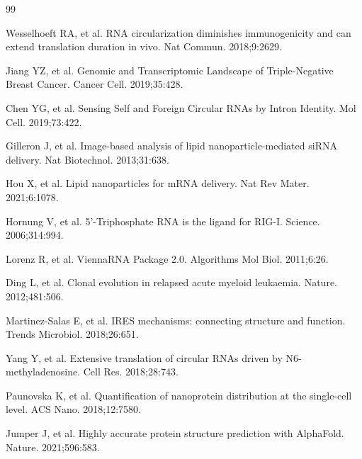 \documentclass[12pt,a4paper]{article}
\begin{document}
\begin{thebibliography}{99}

Wesselhoeft RA, et al. RNA circularization diminishes immunogenicity and can extend translation duration in vivo. Nat Commun. 2018;9:2629.

Jiang YZ, et al. Genomic and Transcriptomic Landscape of Triple-Negative Breast Cancer. Cancer Cell. 2019;35:428.

Chen YG, et al. Sensing Self and Foreign Circular RNAs by Intron Identity. Mol Cell. 2019;73:422.

Gilleron J, et al. Image-based analysis of lipid nanoparticle-mediated siRNA delivery. Nat Biotechnol. 2013;31:638.

Hou X, et al. Lipid nanoparticles for mRNA delivery. Nat Rev Mater. 2021;6:1078.

Hornung V, et al. 5'-Triphosphate RNA is the ligand for RIG-I. Science. 2006;314:994.

Lorenz R, et al. ViennaRNA Package 2.0. Algorithms Mol Biol. 2011;6:26.

Ding L, et al. Clonal evolution in relapsed acute myeloid leukaemia. Nature. 2012;481:506.

Martinez-Salas E, et al. IRES mechanisms: connecting structure and function. Trends Microbiol. 2018;26:651.

Yang Y, et al. Extensive translation of circular RNAs driven by N6-methyladenosine. Cell Res. 2018;28:743.

Paunovska K, et al. Quantification of nanoprotein distribution at the single-cell level. ACS Nano. 2018;12:7580.

Jumper J, et al. Highly accurate protein structure prediction with AlphaFold. Nature. 2021;596:583.

\end{thebibliography}
\end{document}
